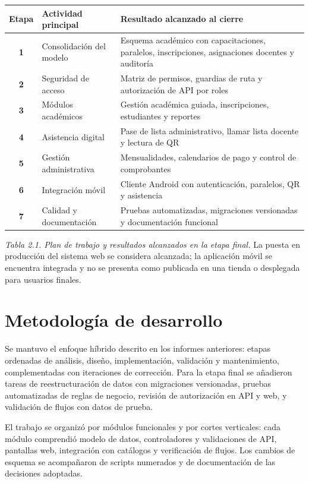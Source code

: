 \documentclass[12pt,a4paper,oneside]{report}
\begin{document}
\renewcommand{\arraystretch}{1.25}
\begin{longtable}{@{}c p{} p{}@{}}
  \toprule
  \textbf{Etapa} & \textbf{Actividad principal} & \textbf{Resultado alcanzado al cierre} \\
  \midrule
  \endhead
  \textbf{1} & Consolidación del modelo & Esquema académico con capacitaciones, paralelos, inscripciones, asignaciones docentes y auditoría \\
  \textbf{2} & Seguridad de acceso & Matriz de permisos, guardias de ruta y autorización de API por roles \\
  \textbf{3} & Módulos académicos & Gestión académica guiada, inscripciones, estudiantes y reportes \\
  \textbf{4} & Asistencia digital & Pase de lista administrativo, llamar lista docente y lectura de QR \\
  \textbf{5} & Gestión administrativa & Mensualidades, calendarios de pago y control de comprobantes \\
  \textbf{6} & Integración móvil & Cliente Android con autenticación, paralelos, QR y asistencia \\
  \textbf{7} & Calidad y documentación & Pruebas automatizadas, migraciones versionadas y documentación funcional \\
  \bottomrule
\end{longtable}

\emph{Tabla 2.1. Plan de trabajo y resultados alcanzados en la etapa final.} La puesta en producción del sistema web se considera alcanzada; la aplicación móvil se encuentra integrada y no se presenta como publicada en una tienda o desplegada para usuarios finales.

\section{Metodología de desarrollo}

Se mantuvo el enfoque híbrido descrito en los informes anteriores: etapas ordenadas de análisis, diseño, implementación, validación y mantenimiento, complementadas con iteraciones de corrección. Para la etapa final se añadieron tareas de reestructuración de datos con migraciones versionadas, pruebas automatizadas de reglas de negocio, revisión de autorización en API y web, y validación de flujos con datos de prueba.

El trabajo se organizó por módulos funcionales y por cortes verticales: cada módulo comprendió modelo de datos, controladores y validaciones de API, pantallas web, integración con catálogos y verificación de flujos. Los cambios de esquema se acompañaron de scripts numerados y de documentación de las decisiones adoptadas.
\end{document}
